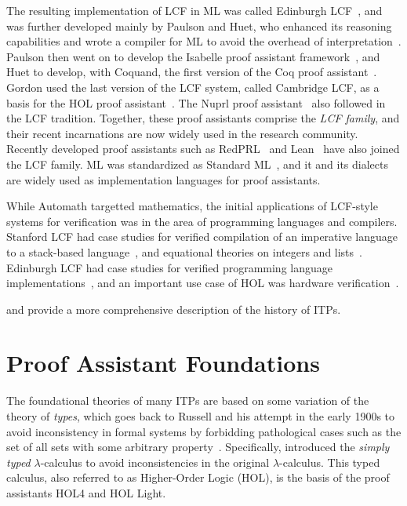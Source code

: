 The resulting implementation of LCF in ML was called Edinburgh LCF~\citep{Milner1979}, and was further developed mainly by Paulson and Huet, who enhanced its reasoning capabilities and wrote a compiler for ML to avoid the overhead of interpretation~\citep{Gordon2000}. Paulson then went on to develop the Isabelle proof assistant framework~\citep{Paulson1994,Paulson2000}, and Huet to develop, with Coquand, the first version of the Coq proof assistant~\citep{Coquand1985}. 
Gordon used the last version of the LCF system, called Cambridge LCF, as a basis for the HOL proof assistant~\citep{Gordon1993}. 
The Nuprl proof assistant~\citep{Constable1986} also followed in the LCF tradition.
Together, these proof assistants comprise the \emph{LCF family}, and their recent incarnations
are now widely used in the research community. 
Recently developed proof assistants such as RedPRL~\citep{redprl} and Lean~\citep{deMoura2015} have also joined the LCF family.
ML was standardized as Standard ML~\citep{Milner1997}, and it and its dialects are widely used as implementation languages for proof assistants.

While Automath targetted mathematics, the initial applications of LCF-style systems for verification was in the area of programming languages and compilers. Stanford LCF had case studies for verified compilation of an imperative language to a stack-based language~\citep{Milner1972}, and equational theories on integers and lists~\citep{Newey1973}. Edinburgh LCF had case studies for verified programming language implementations~\citep{Cohn1983}, and an important use case of HOL was hardware verification~\citep{Boulton1992}.

\cite{pa-history-geuvers-sadhana09} and \cite{Harrison2014} provide a more comprehensive description of the history of ITPs.

\section{Proof Assistant Foundations}
\label{sec:foundations}

The foundational theories of many ITPs are based on some variation of the theory of \emph{types}, which goes back to Russell and his attempt in the early 1900s to avoid inconsistency in formal systems by forbidding pathological cases such as the set of all sets with some arbitrary property~\citep{sep-russell-paradox}. Specifically, \cite{Church1940} introduced the \emph{simply typed} $\lambda$-calculus to avoid inconsistencies in the original $\lambda$-calculus. This typed calculus, also referred to as Higher-Order Logic (HOL), is the basis of the proof assistants HOL4 and HOL Light.

